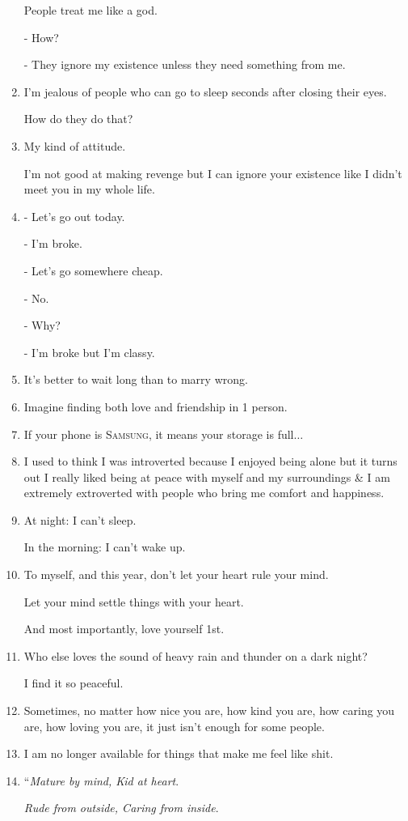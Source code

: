 \documentclass{article}
\begin{document}
\begin{enumerate}
	People treat me like a god.
	
	- How?
	
	- They ignore my existence unless they need something from me.
	\item I'm jealous of people who can go to sleep seconds after closing their eyes.
	
	How do they do that?
	\item My kind of attitude.
	
	I'm not good at making revenge but I can ignore your existence like I didn't meet you in my whole life.
	\item - Let's go out today.
	
	- I'm broke.
	
	- Let's go somewhere cheap.
	
	- No.
	
	- Why?
	
	- I'm broke but I'm classy.
	\item It's better to wait long than to marry wrong.
	\item Imagine finding both love and friendship in 1 person.
	\item If your phone is \textsc{Samsung}, it means your storage is full$\ldots$
	\item I used to think I was introverted because I enjoyed being alone but it turns out I really liked being at peace with myself and my surroundings \& I am extremely extroverted with people who bring me comfort and happiness.
	\item At night: I can't sleep.
	
	In the morning: I can't wake up.
	\item To myself, and this year, don't let your heart rule your mind.
	
	Let your mind settle things with your heart.
	
	And most importantly, love yourself 1st.
	\item Who else loves the sound of heavy rain and thunder on a dark night?
	
	I find it so peaceful.
	\item Sometimes, no matter how nice you are, how kind you are, how caring you are, how loving you are, it just isn't enough for some people.
	\item I am no longer available for things that make me feel like shit.
	\item ``\textit{Mature by mind, Kid at heart}.
	
	\textit{Rude from outside, Caring from inside}.
	

\end{enumerate}
\end{document}
